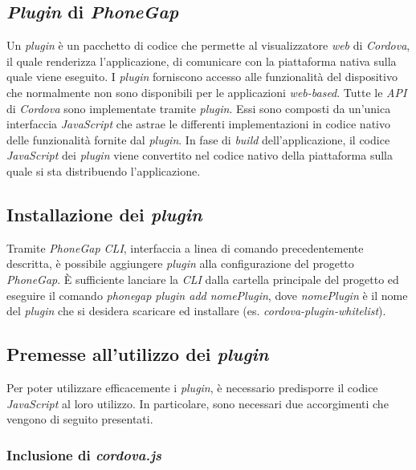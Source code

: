 \subsection{\textit{Plugin} di \textit{PhoneGap}}

Un \textit{plugin} è un pacchetto di codice che permette al visualizzatore \textit{web} di \textit{Cordova}, il quale renderizza l'applicazione, di comunicare con la piattaforma nativa sulla quale viene eseguito. I \textit{plugin} forniscono accesso alle funzionalità del dispositivo che normalmente non sono disponibili per le applicazioni \textit{web-based}. Tutte le \textit{API} di \textit{Cordova} sono implementate tramite \textit{plugin}. Essi sono composti da un'unica interfaccia \textit{JavaScript} che astrae le differenti implementazioni in codice nativo delle funzionalità fornite dal \textit{plugin}. In fase di \textit{build} dell'applicazione, il codice \textit{JavaScript} dei \textit{plugin} viene convertito nel codice nativo della piattaforma sulla quale si sta distribuendo l'applicazione.

\subsection{Installazione dei \textit{plugin}}

Tramite \textit{PhoneGap CLI}, interfaccia a linea di comando precedentemente descritta, è possibile aggiungere \textit{plugin} alla configurazione del progetto \textit{PhoneGap}. È sufficiente lanciare la \textit{CLI} dalla cartella principale del progetto ed eseguire il comando \textit{phonegap plugin add nomePlugin}, dove \textit{nomePlugin} è il nome del \textit{plugin} che si desidera scaricare ed installare (es. \textit{cordova-plugin-whitelist}).

\subsection{Premesse all'utilizzo dei \textit{plugin}}

Per poter utilizzare efficacemente i \textit{plugin}, è necessario predisporre il codice \textit{JavaScript} al loro utilizzo. In particolare, sono necessari due accorgimenti che vengono di seguito presentati.

\subsubsection{Inclusione di \textit{cordova.js}}

